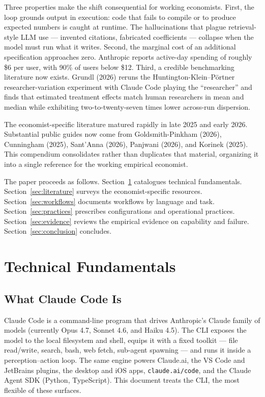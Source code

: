 \documentclass[11pt]{article}
\begin{document}
Three properties make the shift consequential for working economists. First, the loop grounds output in execution: code that fails to compile or to produce expected numbers is caught at runtime. The hallucinations that plague retrieval-style LLM use --- invented citations, fabricated coefficients --- collapse when the model must run what it writes. Second, the marginal cost of an additional specification approaches zero. Anthropic reports active-day spending of roughly \$6 per user, with 90\% of users below \$12. Third, a credible benchmarking literature now exists. Grundl (2026) reruns the Huntington-Klein--P\"ortner researcher-variation experiment with Claude Code playing the ``researcher'' and finds that estimated treatment effects match human researchers in mean and median while exhibiting two-to-twenty-seven times lower across-run dispersion.

The economist-specific literature matured rapidly in late 2025 and early 2026. Substantial public guides now come from Goldsmith-Pinkham (2026), Cunningham (2025), Sant'Anna (2026), Panjwani (2026), and Korinek (2025). This compendium consolidates rather than duplicates that material, organizing it into a single reference for the working empirical economist.

The paper proceeds as follows. Section~\ref{sec:fundamentals} catalogues technical fundamentals. Section~\ref{sec:literature} surveys the economist-specific resources. Section~\ref{sec:workflows} documents workflows by language and task. Section~\ref{sec:practices} prescribes configurations and operational practices. Section~\ref{sec:evidence} reviews the empirical evidence on capability and failure. Section~\ref{sec:conclusion} concludes.

\section{Technical Fundamentals}\label{sec:fundamentals}

\subsection{What Claude Code Is}

Claude Code is a command-line program that drives Anthropic's Claude family of models (currently Opus 4.7, Sonnet 4.6, and Haiku 4.5). The CLI exposes the model to the local filesystem and shell, equips it with a fixed toolkit --- file read/write, search, bash, web fetch, sub-agent spawning --- and runs it inside a perception--action loop. The same engine powers Claude.ai, the VS Code and JetBrains plugins, the desktop and iOS apps, \texttt{claude.ai/code}, and the Claude Agent SDK (Python, TypeScript). This document treats the CLI, the most flexible of these surfaces.
\end{document}
